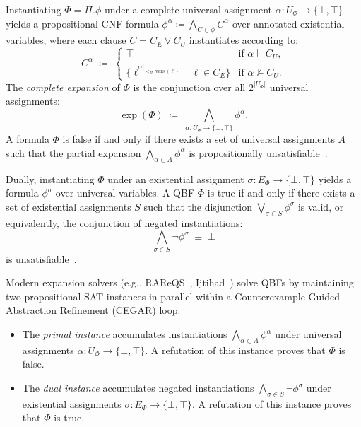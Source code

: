\documentclass[runningheads]{llncs}
\DeclareMathOperator{\vars}{vars}
\DeclareMathOperator{\expn}{exp}
\newcommand{\Bool}{\{\bot,\top\}}
\begin{document}
Instantiating $\Phi = \Pi.\phi$ under a complete universal assignment $\alpha : U_\Phi \to \Bool$ yields a propositional CNF formula $\phi^\alpha \coloneqq \bigwedge_{C \in \phi} C^\alpha$ over annotated existential variables, where each clause $C = C_E \lor C_U$ instantiates according to:
\begin{equation}
    C^\alpha \;\coloneqq\;
    \begin{cases}
        \top                                                     & \text{if } \alpha \models C_U,      \\[2pt]
        \{\ell^{\alpha|_{<_\Pi \vars(\ell)}} \mid \ell \in C_E\} & \text{if } \alpha \not\models C_U .
    \end{cases}
\end{equation}
The \emph{complete expansion} of $\Phi$ is the conjunction over all $2^{|U_\Phi|}$ universal assignments:
\begin{equation}
    \expn(\Phi) \;\coloneqq\; \bigwedge_{\alpha : U_\Phi \to \Bool} \phi^\alpha .
\end{equation}
A formula $\Phi$ is false if and only if there exists a set of universal assignments $A$ such that the partial expansion $\bigwedge_{\alpha \in A} \phi^\alpha$ is propositionally unsatisfiable~\cite{rareqs, ijtihad}.

Dually, instantiating $\Phi$ under an existential assignment $\sigma : E_\Phi \to \Bool$ yields a formula $\phi^\sigma$ over universal variables.
A QBF $\Phi$ is true if and only if there exists a set of existential assignments $S$ such that the disjunction $\bigvee_{\sigma \in S} \phi^\sigma$ is valid, or equivalently, the conjunction of negated instantiations:
\begin{equation}
    \bigwedge_{\sigma \in S} \neg\phi^\sigma \;\equiv\; \bot
\end{equation}
is unsatisfiable~\cite{rareqs, ijtihad}.

Modern expansion solvers (e.g., RAReQS~\cite{rareqs}, Ijtihad~\cite{ijtihad}) solve QBFs by maintaining two propositional SAT instances in parallel within a Counterexample Guided Abstraction Refinement (CEGAR) loop:
\begin{itemize}
    \item The \emph{primal instance} accumulates instantiations $\bigwedge_{\alpha \in A} \phi^\alpha$ under universal assignments $\alpha : U_\Phi \to \Bool$. A refutation of this instance proves that $\Phi$ is false.
    \item The \emph{dual instance} accumulates negated instantiations $\bigwedge_{\sigma \in S} \neg\phi^\sigma$ under existential assignments $\sigma : E_\Phi \to \Bool$. A refutation of this instance proves that $\Phi$ is true.
\end{itemize}
\end{document}
